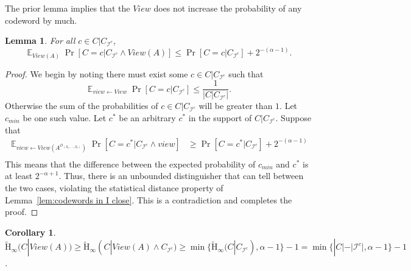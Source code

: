 \documentclass[11pt]{article}
\newcommand{\lemref}[1]{\mbox{Lemma~\ref{#1}}}
\DeclareMathOperator*{\expe}{\mathbb{E}}
\newcommand{\ngl}{\ensuremath{\mathtt{ngl}}\xspace}
\newcommand{\Hav}{\tilde{\mathrm{H}}_\infty}
\newtheorem{lemma}[theorem]{Lemma}
\newtheorem{corollary}[theorem]{Corollary}
\newcommand{\authnote}[2]{{\textcolor{red}{\textsf{#1 notes: }\textcolor{blue}{ #2}}\marginpar{\textcolor{red}{\textbf{!!!!!}}}}}
\newcommand{\authnote}[2]{}
\newcommand{\bnote}[1]{{\authnote{Ben}{#1}}}
\begin{document}
The prior lemma implies that the $View$ does not increase the probability of any codeword by much.
\begin{lemma}
\label{lem:no codeword high prob}
For all $c\in C|C_{\mathcal{I}^c}$, 
\[
\expe_{View(A)} \Pr[C=c | C_{\mathcal{I}^c} \wedge View(A)] \leq \Pr[C=c | C_{\mathcal{I}^c}]+2^{-(\alpha-1)}.
\]
\end{lemma}
\begin{proof}
We begin by noting there must exist some $c\in C|C_{\mathcal{I}^c}$ such that 
\[
\expe_{view\leftarrow View}\Pr[C = c | C_{\mathcal{I}^c}] \le \frac{1}{| C| C_{\mathcal{I}^c}|}.
\]
Otherwise the sum of the probabilities of $c\in C | C_{\mathcal{I}^c}$ will be greater than $1$.  Let $c_{min}$ be one such value.
Let $c^*$ be an arbitrary $c^*$ in the support of $C|C_{\mathcal{I}^c}$.  Suppose that  
\begin{align*}
\expe_{view \leftarrow View(A^{\mathcal{O}_{(X_1,..., X_\ell)}})}\Pr[C=c^* | C_{\mathcal{I}^c} \wedge view ] &\geq \Pr[C=c^* | C_{\mathcal{I}^c} ]+ 2^{-(\alpha-1)} \\
\end{align*}
This means that the difference between the expected probability of $c_{min}$ and $c^*$ is at least $2^{-\alpha+1}$.  Thus, there is an unbounded distinguisher that can tell between the two cases, violating the statistical distance property of   \lemref{lem:codewords in I close}.  This is a contradiction and completes the proof.
\end{proof}
\begin{corollary}
\label{cor:avg min after view}
$\Hav(C| View(A))\geq \Hav(C | View (A) \wedge C_{\mathcal{I}^c}) \geq \min \{ \Hav(C | C_{\mathcal{I}^c}), \alpha-1\} -1= \min\{ |C| - |\mathcal{I}^c|, \alpha-1\} -1$.
\end{corollary}
\end{document}
